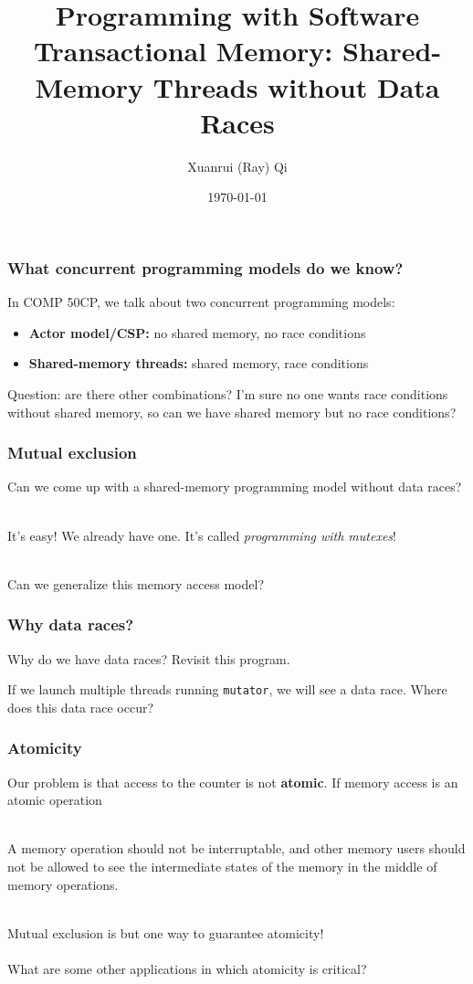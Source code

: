 \documentclass{beamer}
\title[Programming with Software Transactional Memory]{Programming with Software Transactional Memory: Shared-Memory Threads without Data Races}
\author{Xuanrui (Ray) Qi}
\date{\today}
\theoremstyle{plain}
\begin{document}
\begin{frame}
  \titlepage
\end{frame}

\begin{frame}
  \frametitle{What concurrent programming models do we know?}
  In COMP 50CP, we talk about two concurrent programming models:
  \begin{itemize}
  \item \textbf{Actor model/CSP:} no shared memory, no race conditions
  \item \textbf{Shared-memory threads:} shared memory, race conditions
  \end{itemize}

  Question: are there other combinations? I'm sure no one wants race conditions
  without shared memory, so can we have shared memory but no race conditions?
\end{frame}

\begin{frame}
  \frametitle{Mutual exclusion}
  Can we come up with a shared-memory programming model without data races?\\~\\

  \pause

  It's easy! We already have one. It's called \textit{programming with mutexes}!\\~\\

  \pause

  Can we generalize this memory access model?
\end{frame}

\begin{frame}[fragile]
  \frametitle{Why data races?}
  Why do we have data races? Revisit this program.
  
  

  If we launch multiple threads running \lstinline{mutator}, we will see a data race.
  Where does this data race occur?
\end{frame}

\begin{frame}
  \frametitle{Atomicity}
  Our problem is that access to the counter is not \textbf{atomic}. If memory access is
  an atomic operation\\~\\

  \pause

  A memory operation should not be interruptable, and other memory users should not be
  allowed to see the intermediate states of the memory in the middle of memory operations.\\~\\

  \pause
  
  Mutual exclusion is but one way to guarantee atomicity!\\~\\

  \pause
  What are some other applications in which atomicity is critical?
\end{frame}
\end{document}
